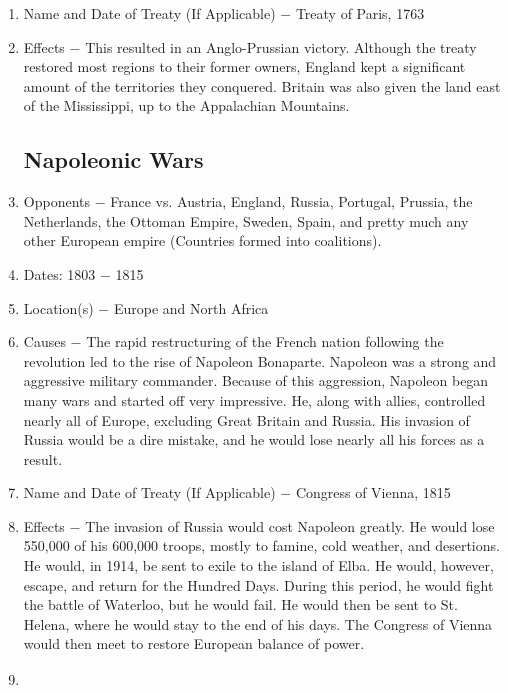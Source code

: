 \documentclass[12pt]{article}
\begin{document}
\begin{enumerate}
\item Name and Date of Treaty (If Applicable) $-$ Treaty of Paris, 1763

\item Effects $-$ This resulted in an Anglo-Prussian victory. Although the treaty restored most regions to their former owners, England kept a significant amount of the territories they conquered. Britain was also given the land east of the Mississippi, up to the Appalachian Mountains. 

\subsection{Napoleonic Wars} 

\item Opponents $-$ France vs. Austria, England, Russia, Portugal, Prussia, the Netherlands, the Ottoman Empire, Sweden, Spain, and pretty much any other European empire (Countries formed into coalitions).

\item Dates: 1803 $-$ 1815

\item Location(s) $-$ Europe and North Africa

\item Causes $-$ The rapid restructuring of the French nation following the revolution led to the rise of Napoleon Bonaparte. Napoleon was a strong and aggressive military commander. Because of this aggression, Napoleon began many wars and started off very impressive. He, along with allies, controlled nearly all of Europe, excluding Great Britain and Russia. His invasion of Russia would be a dire mistake, and he would lose nearly all his forces as a result.

\item Name and Date of Treaty (If Applicable) $-$ Congress of Vienna, 1815

\item Effects $-$ The invasion of Russia would cost Napoleon greatly. He would lose 550,000 of his 600,000 troops, mostly to famine, cold weather, and desertions. He would, in 1914, be sent to exile to the island of Elba. He would, however, escape, and return for the Hundred Days. During this period, he would fight the battle of Waterloo, but he would fail. He would then be sent to St. Helena, where he would stay to the end of his days. The Congress of Vienna would then meet to restore European balance of power.

\item \begin{tabular}{p{} p{} p{} p{} p{}}


\end{tabular}
\end{enumerate}
\end{document}
